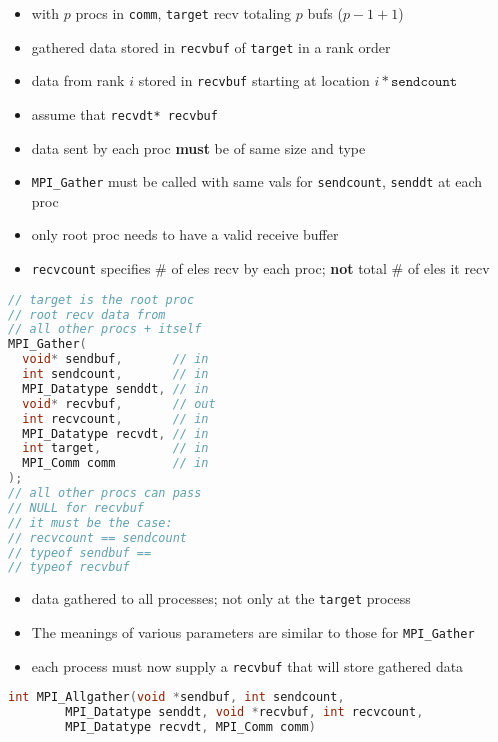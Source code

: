 \documentclass[8pt,a4paper,landscape]{extarticle}
\begin{document}
\begin{multicols*}{3}
\begin{minipage}{0.5\linewidth}
  \flushleft
  \begin{itemize}
  \item with $p$ procs in \texttt{comm}, \texttt{target} recv totaling $p$ bufs ($p-1+1$)
  \item gathered data stored in \texttt{recvbuf} of \texttt{target} in a rank order
  \item data from rank $i$ stored in \texttt{recvbuf} starting at location $i* \texttt{sendcount}$
  \item assume that \texttt{recvdt* recvbuf}
  \item data sent by each proc \textbf{must} be of same size and type
  \item \texttt{MPI\_Gather} must be called with same vals for \texttt{sendcount}, \texttt{senddt} at each proc
  \item only root proc needs to have a valid receive buffer
  \item \texttt{recvcount} specifies $\#$ of eles recv by each proc; \textbf{not} total $\#$ of eles it recv
  \end{itemize}
\end{minipage}
\begin{minipage}{0.5\linewidth}
\begin{lstlisting}[language=c,xleftmargin=1pt]
// target is the root proc
// root recv data from
// all other procs + itself
MPI_Gather(
  void* sendbuf,       // in
  int sendcount,       // in
  MPI_Datatype senddt, // in
  void* recvbuf,       // out
  int recvcount,       // in
  MPI_Datatype recvdt, // in
  int target,          // in
  MPI_Comm comm        // in
);
// all other procs can pass
// NULL for recvbuf
// it must be the case:
// recvcount == sendcount
// typeof sendbuf ==
// typeof recvbuf
\end{lstlisting}
\end{minipage}

\begin{itemize}
  \item data gathered to all processes; not only at the \texttt{target} process
  \item The meanings of various parameters are similar to those for \texttt{MPI\_Gather}
  \item each process must now supply a \texttt{recvbuf} that will store gathered data
  \end{itemize}
\begin{lstlisting}[language=C]
int MPI_Allgather(void *sendbuf, int sendcount,
        MPI_Datatype senddt, void *recvbuf, int recvcount,
        MPI_Datatype recvdt, MPI_Comm comm)
\end{lstlisting}

\end{multicols*}
\end{document}
